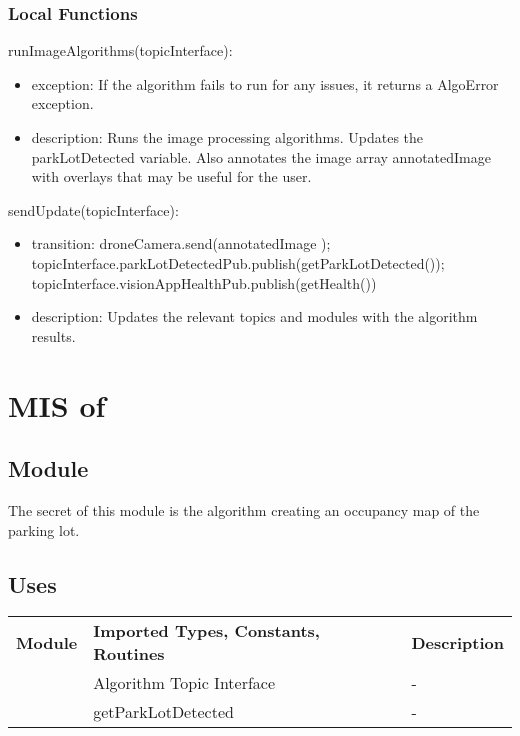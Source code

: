 \documentclass[12pt, titlepage]{article}
\begin{document}
\subsubsection{Local Functions}
\noindent runImageAlgorithms(topicInterface):
\begin{itemize}
\item exception: If the algorithm fails to run for any issues, it returns a AlgoError exception. 
\item description: Runs the image processing algorithms. Updates the parkLotDetected variable. Also annotates the image array annotatedImage with overlays that may be useful for the user. 
\end{itemize}
\noindent sendUpdate(topicInterface):
\begin{itemize}
\item transition: droneCamera.send(annotatedImage ); \\ topicInterface.parkLotDetectedPub.publish(getParkLotDetected()); \\ topicInterface.visionAppHealthPub.publish(getHealth())
\item description: Updates the relevant topics and modules with the algorithm results.
\end{itemize}
\newpage






\section{MIS of } \label{MIS_MAPPER_APP} 
\subsection{Module}
The secret of this module is the algorithm creating an occupancy map of the parking lot.
\subsection{Uses}
\begin{center}
\begin{tabular}{p{2 cm} p{5cm} p{6.5cm} } 
\hline
\textbf{Module} & \textbf{Imported Types, Constants, Routines} & \textbf{Description} \\
\nameref{Algorithm Topic Interface} & Algorithm Topic Interface & - \\
\nameref{Vision App} & getParkLotDetected  & - \\
\hline
\hline
\end{tabular}
\end{center}
\end{document}
